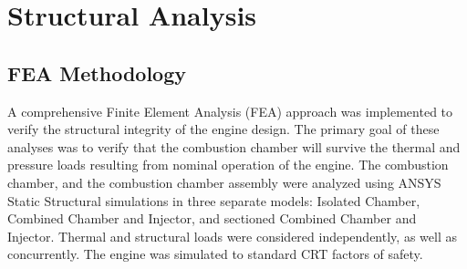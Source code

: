  

\section{Structural Analysis}

\subsection{FEA Methodology}

A comprehensive Finite Element Analysis (FEA) approach was implemented to verify the structural integrity of the engine design. The primary goal of these analyses was to verify that the combustion chamber will survive the thermal and pressure loads resulting from nominal operation of the engine. The combustion chamber, and the combustion chamber assembly were analyzed using ANSYS Static Structural simulations in three separate models: Isolated Chamber, Combined Chamber and Injector, and sectioned Combined Chamber and Injector. Thermal and structural loads were considered independently, as well as concurrently. The engine was simulated to standard CRT factors of safety. 



